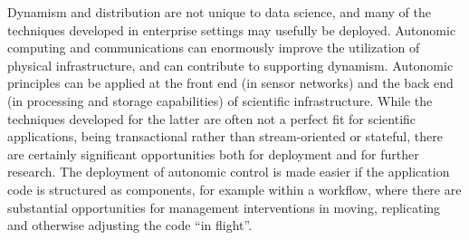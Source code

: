 Dynamism and distribution are not unique to data science, and many of
the techniques developed in enterprise settings may usefully be
deployed.  Autonomic computing and communications can enormously
improve the utilization of physical infrastructure, and can contribute
to supporting dynamism. Autonomic principles can be applied at the
front end (in sensor networks) and the back end (in processing and
storage capabilities) of scientific infrastructure.  While the
techniques developed for the latter are often not a perfect fit for
scientific applications, being transactional rather than
stream-oriented or stateful, there are certainly significant
opportunities both for deployment and for further research.  The
deployment of autonomic control is made easier if the application code
is structured as components, for example within a workflow, where
there are substantial opportunities for management interventions in
moving, replicating and otherwise adjusting the code ``in flight''.








